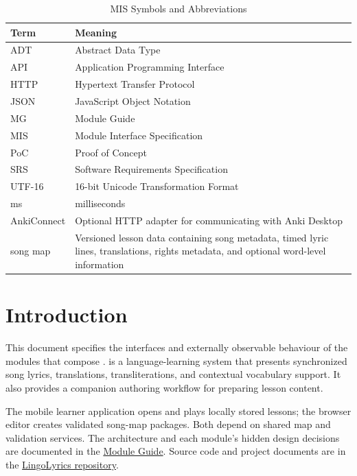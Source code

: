 \documentclass[12pt, titlepage]{article}
\begin{document}
\begin{table}[h!]
\centering
\begin{tabularx}{\textwidth}{p{3cm}X}
\toprule
\textbf{Term} & \textbf{Meaning}\\
\midrule
ADT & Abstract Data Type\\
API & Application Programming Interface\\
HTTP & Hypertext Transfer Protocol\\
JSON & JavaScript Object Notation\\
MG & Module Guide\\
MIS & Module Interface Specification\\
PoC & Proof of Concept\\
SRS & Software Requirements Specification\\
UTF-16 & 16-bit Unicode Transformation Format\\
ms & milliseconds\\
AnkiConnect & Optional HTTP adapter for communicating with Anki Desktop\\
song map & Versioned lesson data containing song metadata, timed lyric lines,
translations, rights metadata, and optional word-level information\\
\bottomrule
\end{tabularx}
\caption{MIS Symbols and Abbreviations}
\label{TblMISSymbols}
\end{table}

\newpage

\tableofcontents

\newpage


\section{Introduction}

This document specifies the interfaces and externally observable behaviour of
the modules that compose \progname{}.  \progname{} is a language-learning
system that presents synchronized song lyrics, translations,
transliterations, and contextual vocabulary support.  It also provides a
companion authoring workflow for preparing lesson content.

The mobile learner
application opens and plays locally stored lessons; the browser editor
creates validated song-map packages. Both depend on shared map and
validation services. The architecture and each module's hidden design
decisions are documented in the
\href{https://github.com/rhea333/LingoLyrics/blob/main/docs/Design/SoftArchitecture/MG.tex}
{Module Guide}. Source code and project documents are in the
\href{https://github.com/rhea333/LingoLyrics}{LingoLyrics repository}.
\end{document}
